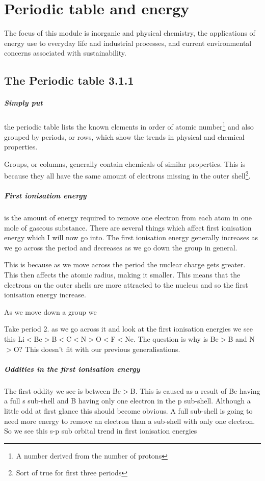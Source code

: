 \chapter{Periodic table and energy}
	The focus of this module is inorganic and physical chemistry, the applications of energy use to everyday life and industrial processes, and current environmental concerns associated with sustainability. 

\section{The Periodic table 3.1.1}
	
	\paragraph{Simply put} the periodic table lists the known elements in order of atomic number\footnote{A number derived from the number of protons} and also grouped by periods, or rows, which show the trends in physical and chemical properties.
	
	Groups, or columns, generally contain chemicals of similar properties. This is because they all have the same amount of electrons missing in the outer shell\footnote{Sort of true for first three periods}.
	
	\paragraph{First ionisation energy} is the amount of energy required to remove one electron from each atom in one mole of gaseous substance. There are several things which affect first ionisation energy which I will now go into.
	The first ionisation energy generally increases as we go across the period and decreases as we go down the group in general. 
	
	This is because as we move across the period the nuclear charge gets greater. This then affects the atomic radius, making it smaller.  This means that the electrons on the outer shells are more attracted to the nucleus and so the first ionisation energy increase.
	
	As we move down a group we
	
	Take period 2. as we go across it and look at the first ionisation energies we see this Li$<$Be$>$B$<$C$<$N$>$O$<$F$<$Ne. The question is why is Be$>$B and N$>$O? This doesn't fit with our previous generalisations.
	
	\paragraph{Oddities in the first ionisation energy} The first oddity we see is between Be$>$B. This is caused as a result of Be having a full s sub-shell and B having only one electron in the p sub-shell. Although a little odd at first glance this should become obvious. A full sub-shell is going to need more energy to remove an electron than a sub-shell with only one electron. So we see this s-p sub orbital trend in first ionisation energies
	
